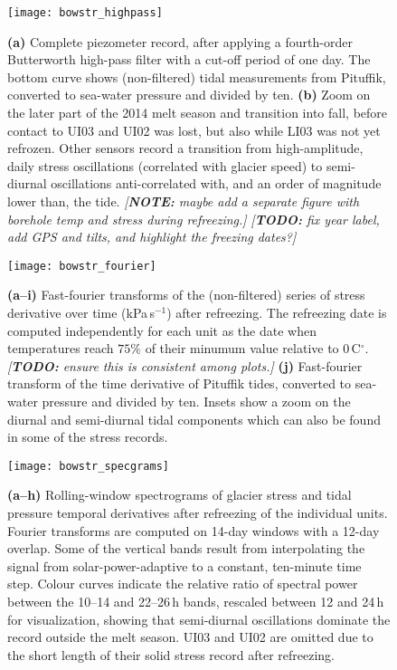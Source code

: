 \documentclass[utf8]{article}
\newcommand{\note}[1]{\textcolor{c0}{\emph{[\textbf{NOTE:} #1]}}}
\newcommand{\todo}[1]{\textcolor{c3}{\emph{[\textbf{TODO:} #1]}}}
\begin{document}
    \begin{figure}
      \centerline{\texttt{[image: bowstr\_highpass]}}
      \caption{%
        \textbf{(a)}
          Complete piezometer record, after applying a fourth-order Butterworth
          high-pass filter with a cut-off period of one day. The bottom curve
          shows (non-filtered) tidal measurements from Pituffik, converted to
          sea-water pressure and divided by ten.
        \textbf{(b)}
          Zoom on the later part of the 2014 melt season and transition into
          fall, before contact to UI03 and UI02 was lost, but also while LI03
          was not yet refrozen. Other sensors record a transition from
          high-amplitude, daily stress oscillations (correlated with glacier
          speed) to semi-diurnal oscillations anti-correlated with, and an
          order of magnitude lower than, the tide.
        \note{
          maybe add a separate figure with borehole temp and stress during
          refreezing.}
        \todo{
          fix year label, add GPS and tilts, and highlight the freezing dates?}}
      \label{fig:highpass}
    \end{figure}

    \begin{figure}
      \centerline{\texttt{[image: bowstr\_fourier]}}
      \caption{%
        \textbf{(a--i)}
          Fast-fourier transforms of the (non-filtered) series of stress
          derivative over time (kPa$\,$s$^{-1}$) after refreezing. The
          refreezing date is computed independently for each unit as the date
          when temperatures reach $75\%$ of their minumum value relative to
          0$\,$C$^\circ$. \todo{ensure this is consistent among plots.}
        \textbf{(j)}
          Fast-fourier transform of the time derivative of Pituffik tides,
          converted to sea-water pressure and divided by ten. Insets show a
          zoom on the diurnal and semi-diurnal tidal components which can also
          be found in some of the stress records.}
      \label{fig:fourier}
    \end{figure}

    \begin{figure}
      \centerline{\texttt{[image: bowstr\_specgrams]}}
      \caption{%
        \textbf{(a--h)}
          Rolling-window spectrograms of glacier stress and tidal pressure
          temporal derivatives after refreezing of the individual units.
          Fourier transforms are computed on 14-day windows with a 12-day
          overlap. Some of the vertical bands result from interpolating the
          signal from solar-power-adaptive to a constant, ten-minute time step.
          Colour curves indicate the relative ratio of spectral power between
          the 10--14 and 22--26\,h bands, rescaled between 12 and 24\,h for
          visualization, showing that semi-diurnal oscillations dominate the
          record outside the melt season. UI03 and UI02 are omitted due to the
          short length of their solid stress record after refreezing.}
      \label{fig:specgrams}
    \end{figure}
\end{document}
